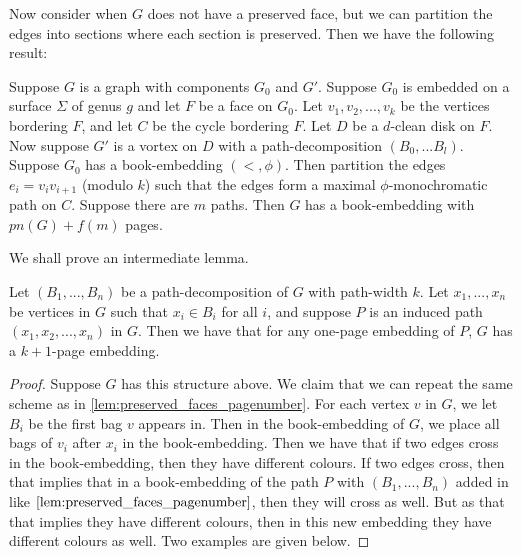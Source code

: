 Now consider when $G$ does not have a preserved face, but we can partition the edges into sections where each section is preserved. Then we have the following result:
\begin{lemma}\label{lem:vortices_mono_paths}
	Suppose $G$ is a graph with components $G_0$ and $G'$. Suppose $G_0$ is embedded on a surface $\Sigma$ of genus $g$ and let $F$ be a face on $G_0$. Let $v_1, v_2, ..., v_k$ be the vertices bordering $F$, and let $C$ be the cycle bordering $F$. Let $D$ be a $d$-clean disk on $F$. Now suppose $G'$ is a vortex on $D$ with a path-decomposition $(B_0, ... B_l)$. Suppose $G_0$ has a book-embedding $(<, \phi)$. Then partition the edges $e_i = v_i v_{i + 1}$ (modulo $k$) such that the edges form a maximal $\phi$-monochromatic path on $C$. Suppose there are $m$ paths. Then $G$ has a book-embedding with $pn(G) + f(m)$ pages.
\end{lemma}
We shall prove an intermediate lemma. 
\begin{lemma}\label{lem:one_page_decomposition}
	Let $(B_1, ..., B_n)$ be a path-decomposition of $G$ with path-width $k$. Let $x_1, ..., x_n$ be vertices in $G$ such that $x_i \in B_i$ for all $i$, and suppose $P$ is an induced path $(x_1, x_2, ..., x_n)$ in $G$. Then we have that for any one-page embedding of $P$, $G$ has a $k + 1$-page embedding. 
\end{lemma}
\begin{proof}
	Suppose $G$ has this structure above.
	We claim that we can repeat the same scheme as in \cref{lem:preserved_faces_pagenumber}. For each vertex $v$ in $G$, we let $B_i$ be the first bag $v$ appears in. Then in the book-embedding of $G$, we place all bags of $v_i$ after $x_i$ in the book-embedding. Then we have that if two edges cross in the book-embedding, then they have different colours. If two edges cross, then that implies that in a book-embedding of the path $P$ with $(B_1, ..., B_n)$ added in like $\cref{lem:preserved_faces_pagenumber}$, then they will cross as well. But as that that implies they have different colours, then in this new embedding they have different colours as well. Two examples are given below.
\end{proof}


